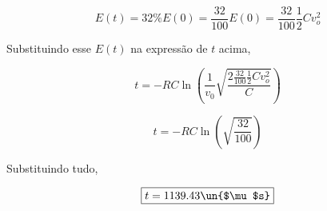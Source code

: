 \[ E(t) = 32\% E(0) = \frac{32}{100}E(0) = \frac{32}{100}\frac{1}{2}Cv_o^2 \]

Substituindo esse $E(t)$ na expressão de $t$ acima,   

\[ t = -RC\ln \left(\frac{1}{v_0} \sqrt{\frac{2\frac{32}{100}\frac{1}{2}Cv_o^2}{C}}\right)  \]

\[ t = -RC\ln \left(\sqrt{\frac{32}{100}}\right)  \]

Substituindo tudo,   

\[ \boxed{t = 1139.43 \un{$\mu$s}}  \]















